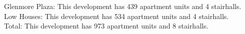 {Glenmore Plaza}: This development has 439 apartment units and 4 stairhalls.\\{Low Houses}: This development has 534 apartment units and 4 stairhalls.\\{Total}: This development has 973 apartment units and 8 stairhalls.\\